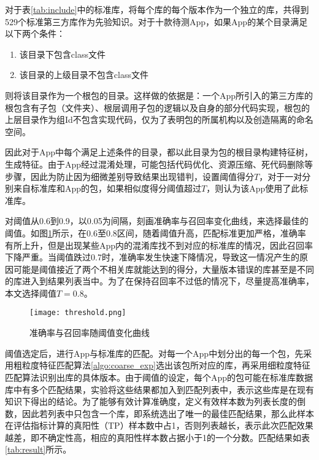 对于表\ref{tab:include}中的标准库，将每个库的每个版本作为一个独立的库，共得到529个标准第三方库作为先验知识。对于十款待测App，如果App的某个目录满足以下两个条件：
\begin{enumerate}
\item{该目录下包含class文件}
\item{该目录的上级目录不包含class文件}
\end{enumerate}
则将该目录作为一个根包的目录。这样做的依据是：一个App所引入的第三方库的根包含有子包（文件夹）、根层调用子包的逻辑以及自身的部分代码实现，根包的上层目录作为组Id不包含实现代码，仅为了表明包的所属机构以及创造隔离的命名空间。


因此对于App中每个满足上述条件的目录，都以此目录为包的根目录构建特征树，生成特征。由于App经过混淆处理，可能包括代码优化、资源压缩、死代码删除等步骤，因此为防止因为细微差别导致结果出现错判，设置阈值得分$T$，对于一对分别来自标准库和App的包，如果相似度得分阈值超过$T$，则认为该App使用了此标准库。

对阈值从0.6到0.9，以0.05为间隔，刻画准确率与召回率变化曲线，来选择最佳的阈值。如图\ref{fig:threshold}所示，在0.6至0.8区间，随着阈值升高，匹配标准更加严格，准确率有所上升，但是出现某些App内的混淆库找不到对应的标准库的情况，因此召回率下降严重。当阈值跌过0.7时，准确率发生快速下降情况，导致这一情况产生的原因可能是阈值接近了两个不相关库就能达到的得分，大量版本错误的库甚至是不同的库进入到结果列表当中。为了在保持召回率不过低的情况下，尽量提高准确率，本文选择阈值$T=0.8$。

\begin{figure}[!htp]
  \centering
  \texttt{[image: threshold.png]} \\
  \caption{准确率与召回率随阈值变化曲线}
 \label{fig:threshold}
\end{figure}


阈值选定后，进行App与标准库的匹配。对每一个App中划分出的每一个包，先采用粗粒度特征匹配算法\ref{algo:coarse_exp}选出该包所对应的库，再采用细粒度特征匹配算法识别出库的具体版本。由于阈值的设定，每个App的包可能在标准库数据库中有多个匹配结果，实验将这些结果都加入到匹配列表中，表示这些库是在现有知识下得出的结论。为了能够有效计算准确度，定义有效样本数为列表长度的倒数，因此若列表中只包含一个库，即系统选出了唯一的最佳匹配结果，那么此样本在评估指标计算的真阳性（TP）样本数中占1，否则列表越长，表示此次匹配效果越差，即不确定性高，相应的真阳性样本数占据小于1的一个分数。匹配结果如表\ref{tab:result}所示。

